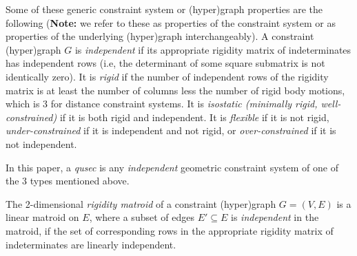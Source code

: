 Some of these generic constraint system or 
(hyper)graph properties are the following ({\bf Note:} we refer to these as
properties of the constraint system or as properties of the underlying
(hyper)graph interchangeably).
%
A constraint (hyper)graph $G$ is {\em independent} if its appropriate rigidity matrix of indeterminates  
has independent rows
(i.e, the determinant of some square submatrix is not
identically zero). 
It is {\em rigid} if the number of independent rows of the rigidity matrix is
at least the number of columns less the number of rigid body motions, 
which is 3 for distance constraint systems. 
It is {\em isostatic (minimally rigid, well-constrained)} 
if it is both rigid and independent. 
It is {\em flexible} if it is not rigid, {\em under-constrained} if it is independent and not rigid, or {\em over-constrained} if it is not independent.


In this paper, a {\em qusec} is any {\em independent} geometric 
constraint system of one of the 3
types mentioned above.




The 2-dimensional {\em rigidity matroid} of a constraint (hyper)graph $G = (V,E)$ is a linear matroid  on $E$, 
where a subset of edges $E' \subseteq E$ is {\em independent} in the matroid, 
if the set of corresponding rows in the appropriate rigidity matrix of indeterminates are linearly independent. 

